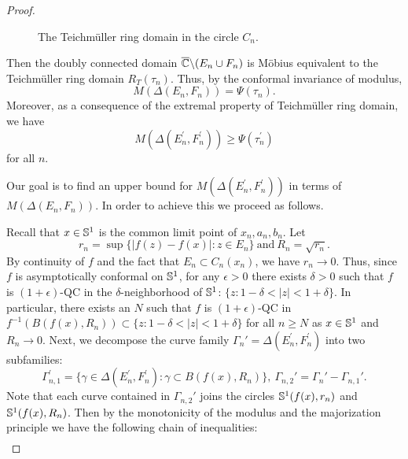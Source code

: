 \documentclass[11pt]{amsart}
\numberwithin{equation}{section}
\theoremstyle{plain}
\theoremstyle{step}
\def\geq{\geqslant}
\newcommand{\abs}[1]{\lvert#1\rvert}
\newcommand{\Ss}{\Bbb{S}^1}
\newcommand{\C}{\Bbb{C}}
\newcommand{\DeltaEFn}{\Delta(E_n,F_n)}
\newcommand{\DeltaEFnprime}{\Delta(E_n^\prime,F_n^\prime)}
\renewcommand{\bar}[1]{\overline{#1}}
\begin{document}
\begin{proof}
\begin{figure}[h]
\caption{The Teichm\"uller ring domain in the circle $C_n$.}
\label{fig:lemma}

\end{figure}
    Then the doubly connected domain $\bar\C\backslash (E_n\cup F_n)$ is M\"obius equivalent to the Teichm\"uller ring domain $R_T(\tau_n)$. Thus, by the conformal invariance of modulus,
    \[
    M(\DeltaEFn)=\Psi(\tau_n).
    \]
    Moreover, as a consequence of the extremal property of Teichm\"uller ring domain, we have 
    \[M(\DeltaEFnprime)\geq \Psi(\tau_n^\prime)\]
    for all $n$. \par
    Our goal is to find an upper bound for $M(\DeltaEFnprime)$ in terms of $M(\DeltaEFn).$ In order to achieve this we proceed as follows. \par
    Recall that $x\in \Ss$ is the common limit point of $x_n,a_n,b_n$. 
    Let 
    \[r_n=\sup \{\abs{f(z)-f(x)}\colon z\in E_n\}\ \text{and} \ R_n=\sqrt{r_n}.\]
    By continuity of $f$ and the fact that $E_n\subset C_n(x_n)$, we have $r_n\to 0$. Thus, since $f$ is asymptotically conformal on $\Ss$, for any $\epsilon>0$ there exists $\delta>0$ such that $f$ is $(1+\epsilon)$-QC in the $\delta$-neighborhood of $\Ss$: $\{z: 1-\delta<|z|<1+\delta\}$. In particular, 
    there exists an $N$ such that $f$ is $(1+\epsilon)$-QC in $f^{-1}(B(f(x),R_n))\subset\{z: 1-\delta<|z|<1+\delta\} $ for all $n\geq N$ as $x\in\Ss$ and $R_n\rightarrow 0$.
    Next, we decompose the curve family $\Gamma_n'=\DeltaEFnprime$ into two subfamilies:
    \[\Gamma_{n,1}^\prime=\{\gamma\in\DeltaEFnprime\colon \gamma\subset B(f(x),R_n)\}, \ \Gamma_{n,2}'=\Gamma_n'-\Gamma_{n,1}'.\]
    Note that each curve contained in $\Gamma_{n,2}'$ joins the circles $\Ss(f(x),r_n)$ and $\Ss(f(x),R_n)$. Then by the monotonicity of the modulus and the majorization principle we have the following chain of inequalities:
    \begin{align*}

\end{align*}
\end{proof}
\end{document}
